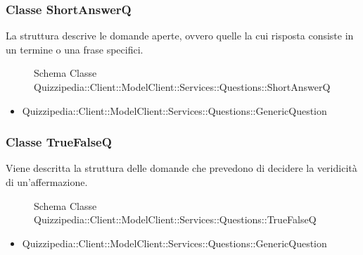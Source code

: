 \subsubsection{Classe ShortAnswerQ}
La struttura descrive le domande aperte, ovvero quelle la cui risposta consiste in un termine o una frase specifici.
\begin{figure}[H]
\centering
\noindent{}
\caption{Schema Classe Quizzipedia::Client::ModelClient::Services::Questions::ShortAnswerQ}
\end{figure}
\begin{itemize}
\item Quizzipedia::Client::ModelClient::Services::Questions::GenericQuestion
\end{itemize}
\subsubsection{Classe TrueFalseQ}
Viene descritta la struttura delle domande che prevedono di decidere la veridicità di un'affermazione.
\begin{figure}[H]
\centering
\noindent{}
\caption{Schema Classe Quizzipedia::Client::ModelClient::Services::Questions::TrueFalseQ}
\end{figure}
\begin{itemize}
\item Quizzipedia::Client::ModelClient::Services::Questions::GenericQuestion
\end{itemize}
